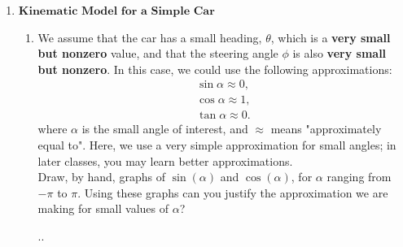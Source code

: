 \documentclass[11pt]{article}
\begin{document}
\begin{enumerate}
   \newpage
   \item $\textbf{Kinematic Model for a Simple Car}$
   \begin{enumerate}
       \item We assume that the car has a small heading, $\theta$, which is a \textbf{very small but nonzero }value, and that the steering angle $\phi$ is also \textbf{very small but nonzero}. In this case, we could use the following approximations:
        \begin{gather*}
            \sin{\alpha} \approx 0,
            \\
            \cos{\alpha} \approx 1,
            \\
            \tan{\alpha} \approx 0.
        \end{gather*}
        where $\alpha$ is the small angle of interest, and $\approx$ means "approximately equal to". Here, we use a very simple approximation for small angles; in later classes, you may learn better approximations. 
        \\
        Draw, by hand, graphs of $\sin(\alpha)$ and $\cos(\alpha)$, for $\alpha$ ranging from $-\pi$ to $\pi$. Using these graphs can you justify the approximation we are making for small values of $\alpha$?
        \begin{Answer}
            ..
        \end{Answer}

        
        
        
         
        
         
        

\end{enumerate}
\end{enumerate}
\end{document}
